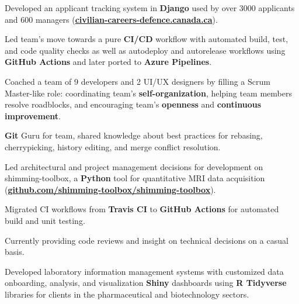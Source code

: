 \documentclass[]{jidicula-resume}
\begin{document}
\vspace{\topsep} %
\begin{tightemize}
\item Developed an applicant tracking system in \textbf{Django} used by over 3000 applicants and 600 managers (\href{https://civilian-careers-defence.canada.ca}{\bf civilian-careers-defence.canada.ca}).
\item Led team's move towards a pure \textbf{CI/CD} workflow with automated build, test, and code quality checks as well as autodeploy and autorelease workflows using \textbf{GitHub Actions} and later ported to \textbf{Azure Pipelines}.
\item Coached a team of 9 developers and 2 UI/UX designers by filling a Scrum Master-like role: coordinating team's \textbf{self-organization}, helping team members resolve roadblocks, and encouraging team's \textbf{openness} and \textbf{continuous improvement}.
\item \textbf{Git} Guru for team, shared knowledge about best practices for rebasing, cherrypicking, history editing, and merge conflict resolution.
\end{tightemize}
\sectionsep{}

\vspace{\topsep} %
\begin{tightemize}
\item Led architectural and project management decisions for development on shimming-toolbox, a \textbf{Python} tool for quantitative MRI data acquisition (\href{https://github.com/shimming-toolbox/shimming-toolbox}{\bf github.com/shimming-toolbox/shimming-toolbox}).
\item Migrated CI workflows from \textbf{Travis CI} to \textbf{GitHub Actions} for automated build and unit testing.
\item Currently providing code reviews and insight on technical decisions on a casual basis.
\end{tightemize}
\sectionsep{}

\vspace{\topsep} %
\begin{tightemize}
\item Developed laboratory information management systems with customized data
  onboarding, analysis, and visualization \textbf{Shiny} dashboards using \textbf{R Tidyverse} libraries
  for clients in the pharmaceutical and biotechnology sectors.
\end{tightemize}
\sectionsep{}
\end{document}

